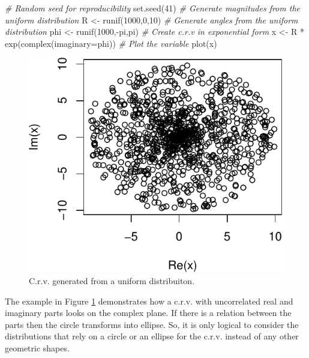 \documentclass[
]{book}
\newenvironment{Shaded}{\begin{snugshade}}{\end{snugshade}}
\newcommand{\AttributeTok}[1]{\textcolor[rgb]{0.77,0.63,0.00}{#1}}
\newcommand{\CommentTok}[1]{\textcolor[rgb]{0.56,0.35,0.01}{\textit{#1}}}
\newcommand{\DecValTok}[1]{\textcolor[rgb]{0.00,0.00,0.81}{#1}}
\newcommand{\FunctionTok}[1]{\textcolor[rgb]{0.00,0.00,0.00}{#1}}
\newcommand{\NormalTok}[1]{#1}
\newcommand{\OtherTok}[1]{\textcolor[rgb]{0.56,0.35,0.01}{#1}}
\newcommand{\SpecialCharTok}[1]{\textcolor[rgb]{0.00,0.00,0.00}{#1}}
\begin{document}
\begin{Shaded}
\begin{Highlighting}[]
\CommentTok{\# Random seed for reproducibility}
\FunctionTok{set.seed}\NormalTok{(}\DecValTok{41}\NormalTok{)}
\CommentTok{\# Generate magnitudes from the uniform distribution}
\NormalTok{R }\OtherTok{\textless{}{-}} \FunctionTok{runif}\NormalTok{(}\DecValTok{1000}\NormalTok{,}\DecValTok{0}\NormalTok{,}\DecValTok{10}\NormalTok{)}
\CommentTok{\# Generate angles from the uniform distribution}
\NormalTok{phi }\OtherTok{\textless{}{-}} \FunctionTok{runif}\NormalTok{(}\DecValTok{1000}\NormalTok{,}\SpecialCharTok{{-}}\NormalTok{pi,pi)}
\CommentTok{\# Create c.r.v in exponential form}
\NormalTok{x }\OtherTok{\textless{}{-}}\NormalTok{ R }\SpecialCharTok{*} \FunctionTok{exp}\NormalTok{(}\FunctionTok{complex}\NormalTok{(}\AttributeTok{imaginary=}\NormalTok{phi))}
\CommentTok{\# Plot the variable}
\FunctionTok{plot}\NormalTok{(x)}
\end{Highlighting}
\end{Shaded}

\begin{figure}
\centering
\includegraphics{Svetunkov---Svetunkov---Complex-Valued-Econometrics_files/figure-latex/crvGeneratedCircle-1.pdf}
\caption{\label{fig:crvGeneratedCircle}C.r.v. generated from a uniform distribuiton.}
\end{figure}

The example in Figure \ref{fig:crvGeneratedCircle} demonstrates how a c.r.v. with uncorrelated real and imaginary parts looks on the complex plane. If there is a relation between the parts then the circle transforms into ellipse. So, it is only logical to consider the distributions that rely on a circle or an ellipse for the c.r.v. instead of any other geometric shapes.
\end{document}

